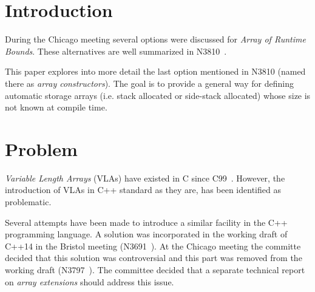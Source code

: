 \section{Introduction}

During the Chicago meeting several options were discussed for \emph{Array of
Runtime Bounds}. These alternatives are well summarized in N3810~\cite{n3810}.

This paper explores into more detail the last option mentioned in N3810 (named
there as \emph{array constructors}). The goal is to provide a general way for
defining automatic storage arrays (i.e. stack allocated or side-stack allocated)
whose size is not known at compile time.

\section{Problem}

\emph{Variable Length Arrays} (VLAs) have existed in C since C99~\cite{c99}. However,
the introduction of VLAs in C++ standard as they are, has been identified as
problematic.

Several attempts have been made to introduce a similar facility in the C++
programming language. A solution was incorporated in the working draft of C++14
in the Bristol meeting (N3691~\cite{n3691}). At the Chicago meeting the committe
decided that this solution was controversial and this part was removed from the
working draft (N3797~\cite{n3797}). The committee decided that a separate
technical report on \emph{array extensions} should address this issue.




